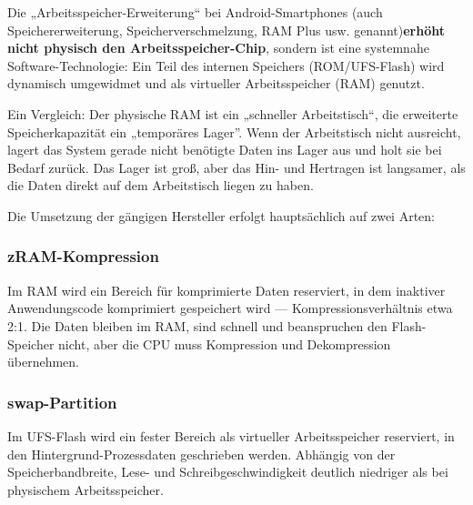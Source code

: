 


Die „Arbeitsspeicher-Erweiterung“ bei Android-Smartphones (auch Speichererweiterung, Speicherverschmelzung, RAM Plus usw. genannt)\textbf{erhöht nicht physisch den Arbeitsspeicher-Chip}, sondern ist eine systemnahe Software-Technologie: Ein Teil des internen Speichers (ROM/UFS-Flash) wird dynamisch umgewidmet und als virtueller Arbeitsspeicher (RAM) genutzt.

Ein Vergleich: Der physische RAM ist ein „schneller Arbeitstisch“, die erweiterte Speicherkapazität ein „temporäres Lager”. Wenn der Arbeitstisch nicht ausreicht, lagert das System gerade nicht benötigte Daten ins Lager aus und holt sie bei Bedarf zurück. Das Lager ist groß, aber das Hin- und Hertragen ist langsamer, als die Daten direkt auf dem Arbeitstisch liegen zu haben.


Die Umsetzung der gängigen Hersteller erfolgt hauptsächlich auf zwei Arten:

\subsubsection*{zRAM-Kompression}

Im RAM wird ein Bereich für komprimierte Daten reserviert, in dem inaktiver Anwendungscode komprimiert gespeichert wird — Kompressionsverhältnis etwa 2:1. Die Daten bleiben im RAM, sind schnell und beanspruchen den Flash-Speicher nicht, aber die CPU muss Kompression und Dekompression übernehmen.

\subsubsection*{swap-Partition}

Im UFS-Flash wird ein fester Bereich als virtueller Arbeitsspeicher reserviert, in den Hintergrund-Prozessdaten geschrieben werden. Abhängig von der Speicherbandbreite, Lese- und Schreibgeschwindigkeit deutlich niedriger als bei physischem Arbeitsspeicher.

